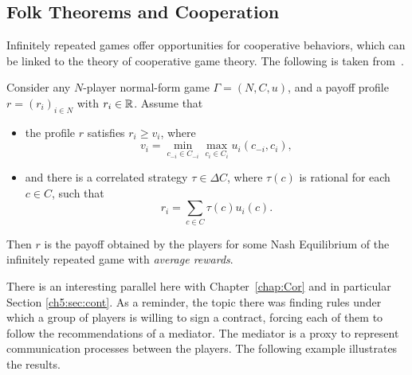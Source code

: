 \subsection{Folk Theorems and Cooperation}
Infinitely repeated games offer opportunities for cooperative behaviors,
which can be linked to the theory of cooperative game theory.
The following is taken from~\cite[Theorem 6.15]{ShLeMSAG}.
\begin{theorem}
\label{ch9:thm:folk1}
Consider any $N$-player normal-form game $\Gamma = (N,C,u)$, and a
payoff profile $r = (r_i)_{i \in N}$ with $r_i \in \mathbb{R}$.
Assume that
\begin{itemize}
    \item the profile $r$ satisfies $r_i \geq v_i$, where
    $$v_i = \min_{c_{-i} \in C_{-i}} \max_{c_i \in C_i}
    u_i(c_{-i}, c_i),$$
    \item and there is a correlated strategy $\tau \in \Delta C$, where
    $\tau(c)$ is rational for each $c \in C$, such that
    $$r_i = \sum_{c \in C} \tau(c) u_i(c).$$
\end{itemize}
Then $r$ is the payoff obtained by the players for some Nash Equilibrium
of the infinitely repeated game with \emph{average rewards}.
\end{theorem}

There is an interesting parallel here with Chapter~\ref{chap:Cor} and in
particular Section \ref{ch5:sec:cont}.
As a reminder, the topic there was finding rules under which a group of
players is willing to sign a contract, forcing each of them to follow the
recommendations of a mediator. The mediator is a proxy to represent
communication processes between the players. The following example
illustrates the results.

